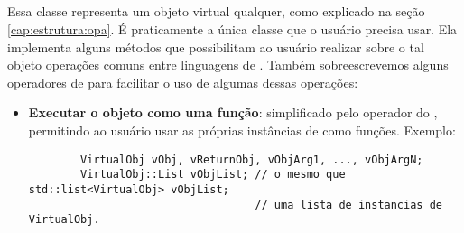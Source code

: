   \subsection{\VObj{}}
  \label{sec:atividades:opa:vobj}
  Essa classe representa um objeto virtual qualquer, como explicado na seção
  \ref{cap:estrutura:opa}. É praticamente a única classe que o
  usuário precisa usar. Ela implementa alguns métodos que possibilitam ao
  usuário realizar sobre o tal objeto operações comuns entre linguagens de
  \script{}. Também sobreescrevemos alguns operadores de \CXX{} para facilitar o
  uso de algumas dessas operações:
  \begin{itemize}
    \item \textbf{Executar o objeto como uma função}: simplificado pelo operador \lang{()}
      do \CXX{}, permitindo ao usuário usar as próprias instâncias de \VObj{} como
      funções. Exemplo:
      \vspace{1em}
      \begin{lstlisting}
        VirtualObj vObj, vReturnObj, vObjArg1, ..., vObjArgN; 
        VirtualObj::List vObjList; // o mesmo que std::list<VirtualObj> vObjList;
                                   // uma lista de instancias de VirtualObj.
                                   

\end{lstlisting}
\end{itemize}

